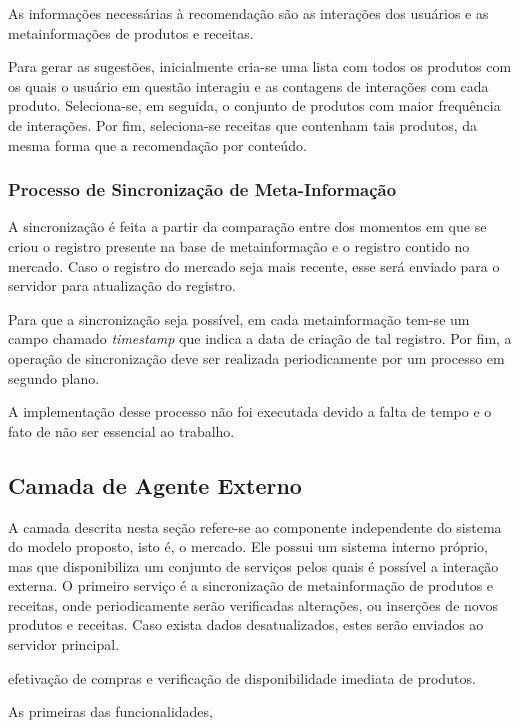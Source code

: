 As informações necessárias à recomendação são as interações dos usuários e as metainformações de produtos e receitas.

Para gerar as sugestões, inicialmente cria-se uma lista com todos os produtos com os quais o usuário em questão interagiu e as contagens de interações com cada produto. Seleciona-se, em seguida, o conjunto de produtos com maior frequência de interações. Por fim, seleciona-se receitas que contenham tais produtos, da mesma forma que a recomendação por conteúdo.

\subsubsection{Processo de Sincronização de Meta-Informação}

A sincronização é feita a partir da comparação entre dos momentos em que se criou o registro presente na base de metainformação e o registro contido no mercado. Caso o registro do mercado seja mais recente, esse será enviado para o servidor para atualização do registro. 

Para que a sincronização seja possível, em cada metainformação tem-se um campo chamado  \textit{timestamp} que indica a data de criação de tal registro.
Por fim, a operação de sincronização deve ser realizada periodicamente por um processo em segundo plano.

A implementação desse processo não foi executada devido a falta de tempo e o fato de não ser essencial ao trabalho.


\subsection{Camada de Agente Externo}



A camada descrita nesta seção refere-se ao componente independente do sistema do modelo proposto, isto é, o mercado. Ele possui um sistema interno próprio, mas que disponibiliza um conjunto de serviços pelos quais é possível a interação externa. O primeiro serviço é a sincronização de metainformação de produtos e receitas, onde periodicamente serão verificadas alterações, ou inserções de novos produtos e receitas. Caso exista dados desatualizados, estes serão enviados ao servidor principal.

efetivação de compras e verificação de disponibilidade imediata de produtos.

As primeiras das funcionalidades,  

